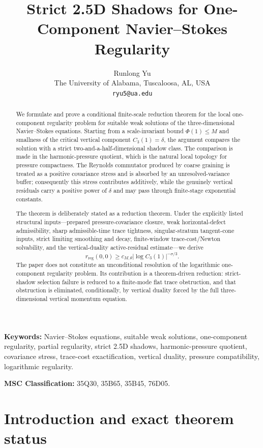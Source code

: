 \documentclass[11pt]{article}
\title{Strict 2.5D Shadows for One-Component Navier--Stokes Regularity}
\author{Runlong Yu\\
The University of Alabama, Tuscaloosa, AL, USA\\
\texttt{ryu5@ua.edu}}
\date{}
\numberwithin{equation}{section}
\theoremstyle{plain}
\theoremstyle{definition}
\theoremstyle{remark}
\begin{document}
\maketitle
\begin{abstract}
We formulate and prove a conditional finite-scale reduction theorem for the local one-component regularity problem for suitable weak solutions of the three-dimensional Navier--Stokes equations.  Starting from a scale-invariant bound \(\Phi(1)\le M\) and smallness of the critical vertical component \(C_3(1)=\delta\), the argument compares the solution with a strict two-and-a-half-dimensional shadow class.  The comparison is made in the harmonic-pressure quotient, which is the natural local topology for pressure compactness.  The Reynolds commutator produced by coarse graining is treated as a positive covariance stress and is absorbed by an unresolved-variance buffer; consequently this stress contributes additively, while the genuinely vertical residuals carry a positive power of \(\delta\) and may pass through finite-stage exponential constants.

The theorem is deliberately stated as a reduction theorem.  Under the explicitly listed structural inputs---prepared pressure-covariance closure, weak horizontal-defect admissibility, sharp admissible-time trace tightness, singular-stratum tangent-cone inputs, strict limiting smoothing and decay, finite-window trace-cost/Newton solvability, and the vertical-duality active-residual estimate---we derive
\[
        r_{\mathrm{reg}}(0,0)\ge c_{M,\theta}|\log C_3(1)|^{-\sigma/3}.
\]
The paper does not constitute an unconditional resolution of the logarithmic one-component regularity problem.  Its contribution is a theorem-driven reduction: strict-shadow selection failure is reduced to a finite-mode flat trace obstruction, and that obstruction is eliminated, conditionally, by vertical duality forced by the full three-dimensional vertical momentum equation.
\end{abstract}

\noindent\textbf{Keywords:} Navier--Stokes equations, suitable weak solutions, one-component regularity, partial regularity, strict 2.5D shadows, harmonic-pressure quotient, covariance stress, trace-cost exactification, vertical duality, pressure compatibility, logarithmic regularity.

\medskip
\noindent\textbf{MSC Classification:} 35Q30, 35B65, 35B45, 76D05.

\tableofcontents

\section{Introduction and exact theorem status}\label{sec:main-introduction}
\end{document}
